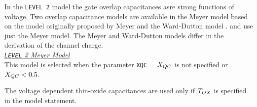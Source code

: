 {
In the {\tt LEVEL 2} model the gate overlap capacitances
asre strong functions of voltage.
Two overlap capacitance models are available in \pspice
the Meyer model based on the model originally proposed by Meyer \cite{meyer:71}
and the Ward-Dutton model
\cite{ward:dutton:78,oh:ward:80}.
\spicetwo and \spicethree use just the Meyer model.
The Meyer and Ward-Dutton models differ in the derivation of the channel charge.
\\[0.2in]
\noindent\underline{\sl \large {\tt LEVEL} 2 Meyer Model}\\[0.1in]
This model is selected when the parameter {\tt XQC} = $X_{QC}$ is not specified or
$X_{QC} < 0.5$.

The voltage dependent thin-oxide capacitances are used only if $T_{OX}$ is
specified in the model statement.

}
